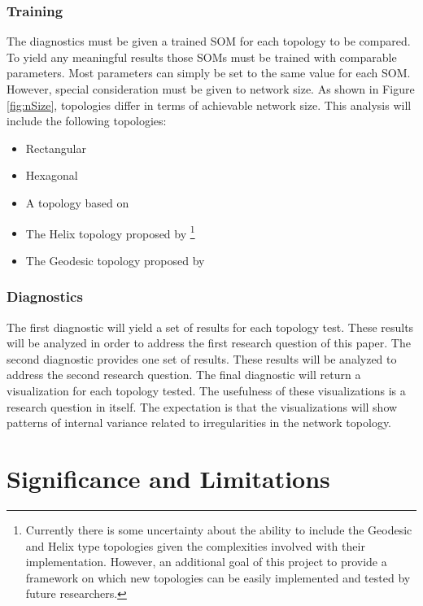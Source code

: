 \documentclass[10pt,titlepage]{article}
\begin{document}
\subsubsection{Training}
The diagnostics must be given a trained SOM for each topology to be compared. To
yield any meaningful results those SOMs must be trained with comparable
parameters. Most parameters can simply be set to the same value for each SOM.
However, special consideration must be given to network size.  As shown in
Figure \ref{fig:nSize}, topologies differ in terms of achievable network size.
This analysis will include the following topologies:
\begin{itemize}
\item Rectangular
\item Hexagonal
\item A topology based on \cite{Rakhmanov94}
\item The Helix topology proposed by \cite{Nishio:2006fk}\footnote{Currently
there is some uncertainty about the ability to include the Geodesic and Helix
type topologies given the complexities involved with their implementation.
However, an additional goal of this project to provide a framework on which new
topologies can be easily implemented and tested by future researchers.}
\item The Geodesic topology proposed by \cite{wu2006}\footnotemark[2]
\end{itemize}

\subsubsection{Diagnostics}
The first diagnostic will yield a set of results for each topology test.  These
results will be analyzed in order to address the first research question of this
paper.  The second diagnostic provides one set of results.  These results will
be analyzed to address the second research question.  The final diagnostic will
return a visualization for each topology tested.  The usefulness of these
visualizations is a research question in itself.  The expectation is that the
visualizations will show patterns of internal variance related to irregularities
in the network topology.

\section{Significance and Limitations}
\end{document}
